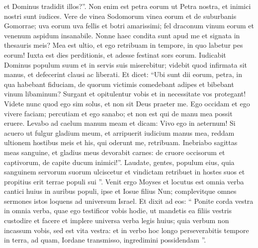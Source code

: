 \begin{biblechapter}
\begin{biblechapter}
\begin{biblechapter}
\begin{biblechapter}
\begin{biblechapter}
\begin{biblechapter}
\begin{biblechapter}
\begin{biblechapter}
\begin{biblechapter}
\begin{biblechapter}
\begin{biblechapter}
\begin{biblechapter}
\begin{biblechapter}
\begin{biblechapter}
\begin{biblechapter}
\begin{biblechapter}
\begin{biblechapter}
\begin{biblechapter}
\begin{biblechapter}
\begin{biblechapter}
\begin{biblechapter}
\begin{biblechapter}
\begin{biblechapter}
\begin{biblechapter}
\begin{biblechapter}
\begin{biblechapter}
\begin{biblechapter}
\begin{biblechapter}
\begin{biblechapter}
\begin{biblechapter}
\begin{biblechapter}
\begin{biblechapter}
 et Dominus tradidit illos?”.
 \verse Non enim est petra eorum ut Petra nostra,
 et inimici nostri sunt iudices.
 \verse Vere de vinea Sodomorum vinea eorum
 et de suburbanis Gomorrae;
 uva eorum uva fellis
 et botri amarissimi;
 \verse fel draconum vinum eorum
 et venenum aspidum insanabile.
 \verse Nonne haec condita sunt apud me
 et signata in thesauris meis?
 \verse Mea est ultio, et ego retribuam in tempore,
 in quo labetur pes eorum!
 Iuxta est dies perditionis,
 et adesse festinat sors eorum.
 \verse Iudicabit Dominus populum suum
 et in servis suis miserebitur;
 videbit quod infirmata sit manus,
 et defecerint clausi ac liberati.
 \verse Et dicet: “Ubi sunt dii eorum,
 petra, in qua habebant fiduciam,
 \verse de quorum victimis comedebant adipes
 et bibebant vinum libaminum?
 Surgant et opitulentur vobis
 et in necessitate vos protegant!
 \verse Videte nunc quod ego sim solus,
 et non sit Deus praeter me.
 Ego occidam et ego vivere faciam;
 percutiam et ego sanabo;
 et non est qui de manu mea possit eruere.
 \verse Levabo ad caelum manum meam
 et dicam: Vivo ego in aeternum!
 \verse Si acuero ut fulgur gladium meum,
 et arripuerit iudicium manus mea,
 reddam ultionem hostibus meis
 et his, qui oderunt me, retribuam.
 \verse Inebriabo sagittas meas sanguine,
 et gladius meus devorabit carnes:
 de cruore occisorum et captivorum,
 de capite ducum inimici!”.
 \verse Laudate, gentes, populum eius,
 quia sanguinem servorum suorum ulciscetur
 et vindictam retribuet in hostes suos
 et propitius erit terrae populi sui ”.
 \verse Venit ergo Moyses et locutus est omnia verba cantici huius in auribus populi, ipse et Iosue filius Nun; 
\verse complevitque omnes sermones istos loquens ad universum Israel. 
\verse Et dixit ad eos: “ Ponite corda vestra in omnia verba, quae ego testificor vobis hodie, ut mandetis ea filiis vestris custodire et facere et implere universa verba legis huius; 
\verse quia verbum non incassum vobis, sed est vita vestra: et in verbo hoc longo perseverabitis tempore in terra, ad quam, Iordane transmisso, ingredimini possidendam ”.

\end{biblechapter}
\end{biblechapter}
\end{biblechapter}
\end{biblechapter}
\end{biblechapter}
\end{biblechapter}
\end{biblechapter}
\end{biblechapter}
\end{biblechapter}
\end{biblechapter}
\end{biblechapter}
\end{biblechapter}
\end{biblechapter}
\end{biblechapter}
\end{biblechapter}
\end{biblechapter}
\end{biblechapter}
\end{biblechapter}
\end{biblechapter}
\end{biblechapter}
\end{biblechapter}
\end{biblechapter}
\end{biblechapter}
\end{biblechapter}
\end{biblechapter}
\end{biblechapter}
\end{biblechapter}
\end{biblechapter}
\end{biblechapter}
\end{biblechapter}
\end{biblechapter}
\end{biblechapter}
